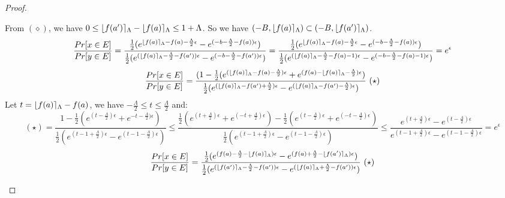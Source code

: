 \documentclass[a4paper,11pt]{article}
\begin{document}
\begin{proof}
\begin{itemize}
	From $(\diamond)$, we have $0 \leq \lfloor f(a') \rceil_{\Lambda} - \lfloor f(a) \rceil_{\Lambda} \leq 1 + \Lambda$.
	So we have $(-B, \lfloor f(a) \rceil_{\Lambda}) \subset (-B, \lfloor f(a') \rceil_{\Lambda})$.
	\[
	\frac{Pr[x \in E]}{Pr[y \in E]} 
	= \frac{\frac{1}{2}(
				e^{\lfloor f(a) \rceil_{\Lambda} - f(a) -\frac{\Lambda}{2}\epsilon}
				- e^{(-b -\frac{\Lambda}{2} - f(a))\epsilon})}
				{\frac{1}{2}(
				e^{(\lfloor f(a) \rceil_{\Lambda} -\frac{\Lambda}{2} - f(a'))\epsilon}
				- e^{(-b -\frac{\Lambda}{2} - f(a'))\epsilon})} \\
	= \frac{\frac{1}{2}(
				e^{\lfloor f(a) \rceil_{\Lambda} - f(a) -\frac{\Lambda}{2}\epsilon}
				- e^{(-b -\frac{\Lambda}{2} - f(a))\epsilon})}
				{\frac{1}{2}(
				e^{(\lfloor f(a) \rceil_{\Lambda} -\frac{\Lambda}{2} - f(a) - 1)\epsilon}
				- e^{(-b -\frac{\Lambda}{2} - f(a) - 1)\epsilon})} \\
	= e^{\epsilon}
	\]
%
	\[
	\frac{Pr[x \in E]}{Pr[y \in E]} 
	= \frac{(1 - {\frac{1}{2}(
				e^{(\round{f(a)}_{\Lambda} - f(a) - \frac{\Lambda}{2})\epsilon}
				+ e^{(f(a) - \round{f(a)}_{\Lambda} -\frac{\Lambda}{2})\epsilon})}
			}
			{\frac{1}{2}(
				e^{(\round{f(a)}_{\Lambda} - f(a') + \frac{\Lambda}{2})\epsilon}
				- e^{(\round{f(a)}_{\Lambda} - f(a') - \frac{\Lambda}{2})\epsilon})}~(\star)
	\]
	Let $t = \lfloor f(a) \rceil_{\Lambda} - f(a)$, we have $-\frac{\Lambda}{2} \leq t \leq \frac{\Lambda}{2} $ and:
	\[
	(\star) = \frac{1 - {\frac{1}{2}(
				e^{(t - \frac{\Lambda}{2})\epsilon}
				+ e^{-t -\frac{\Lambda}{2})\epsilon})}
			}
			{\frac{1}{2}(
				e^{(t - 1 + \frac{\Lambda}{2})\epsilon}
				- e^{(t - 1 - \frac{\Lambda}{2})\epsilon})}
	\leq \frac{\frac{1}{2}(
				e^{(t + \frac{\Lambda}{2})\epsilon}
				+ e^{(-t +\frac{\Lambda}{2})\epsilon}) 
				- \frac{1}{2}(
				e^{(t - \frac{\Lambda}{2})\epsilon}
				+ e^{(-t -\frac{\Lambda}{2})\epsilon})
			}
			{\frac{1}{2}(
				e^{(t - 1 + \frac{\Lambda}{2})\epsilon}
				- e^{(t - 1 - \frac{\Lambda}{2})\epsilon})}
	\leq \frac{
				e^{(t + \frac{\Lambda}{2})\epsilon} 
				-
				e^{(t - \frac{\Lambda}{2})\epsilon}
			}
			{
				e^{(t - 1 + \frac{\Lambda}{2})\epsilon}
				- e^{(t - 1 - \frac{\Lambda}{2})\epsilon}
			}	
	= e^{\epsilon}
	\]
	\[
	\frac{Pr[x \in E]}{Pr[y \in E]} 
	= \frac{
			\frac{1}{2}(
				e^{(f(a) - \frac{\Lambda}{2} - \round{f(a)}_{\Lambda})\epsilon}
				- e^{(f(a) + \frac{\Lambda}{2} - \round{f(a')}_{\Lambda})\epsilon})
			}
			{
			\frac{1}{2}(
				e^{(\round{f(a')}_{\Lambda} - \frac{\Lambda}{2} - f(a'))\epsilon}
				- e^{(\round{f(a)}_{\Lambda} + \frac{\Lambda}{2}  - f(a'))\epsilon})
			} ~ (\star)
	\]
	\begin{itemize}


\end{itemize}
\end{itemize}
\end{proof}
\end{document}
